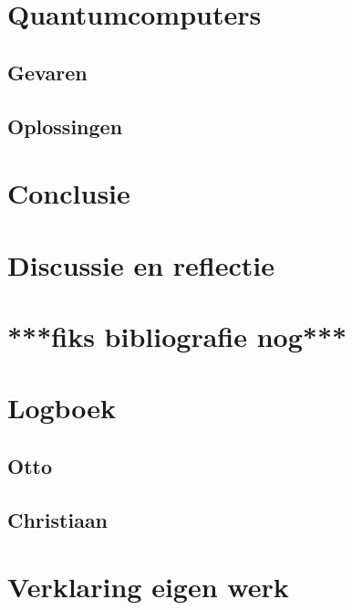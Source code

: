 \documentclass{report} %
\begin{document}
\chapter{Quantumcomputers}
\section{Gevaren}

\section{Oplossingen}

\chapter{Conclusie}

\chapter{Discussie en reflectie}

\chapter{***fiks bibliografie nog***}
%

\chapter{Logboek}
\section{Otto}

\section{Christiaan}


\chapter{Verklaring eigen werk}
\end{document}
